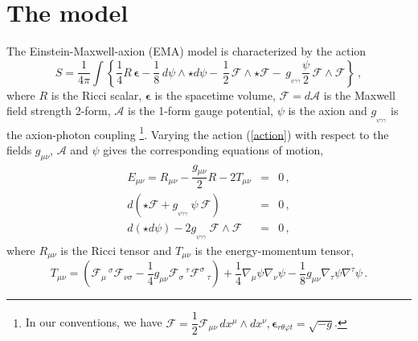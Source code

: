 \documentclass[11pt]{article}
\numberwithin{equation}{section} %
\begin{document}
\bigskip


	\section{The model}
	\label{sec2}



 The Einstein-Maxwell-axion (EMA) model is characterized by the action 
%
\begin{equation}
\label{action}
S= \frac{1}{4 \pi}\int \left\{\dfrac{1}{4}R\, \boldsymbol{\epsilon}
-\dfrac{1}{8}\, d\psi\wedge\star d \psi
-\, \dfrac{1}{2}\, 
\mathcal{F}\wedge\star\mathcal{F}
-\, g_{_{\psi\gamma\gamma}}\dfrac{\psi}{2}\, 
\mathcal{F}\wedge\mathcal{F}\right\} \ ,
\end{equation}
%
where $R$ is the Ricci scalar, $\boldsymbol{\epsilon}$ is the spacetime volume, $\mathcal{F}=d\mathcal{A}$ is the Maxwell field strength 2-form, $\mathcal{A}$ is the 1-form gauge potential, $\psi$ is the axion and $g_{_{\psi\gamma\gamma}}$ is the axion-photon coupling \footnote{In our conventions, we have $\mathcal{F}=\dfrac{1}{2}\mathcal{F}_{\mu\nu}\,dx^\mu\wedge dx^\nu, \boldsymbol{\epsilon}_{r\theta\varphi t}=\sqrt{-g}$. }. Varying the action (\ref{action}) with respect to the fields $g_{\mu\nu}$,  $\mathcal{A}$  {and  $\psi$}  gives the corresponding equations of motion,
%
\begin{eqnarray}
\label{EME}
E_{\mu\nu}=R_{\mu\nu}-\dfrac{g_{\mu\nu}}{2}R-2T_{\mu\nu}&=&0\,,
\\
\label{ME}
d\left(\star\mathcal{F}+g_{_{\psi\gamma\gamma}}\ \psi\ \mathcal{F}\right)&=&0
\,,
\\
\label{DE}
d\left(\star d\psi\right)-2g_{_{\psi\gamma\gamma}}\ \mathcal{F}\wedge\mathcal{F}&=&0 \,,
 \end{eqnarray}
  {where \(R_{\mu\nu}\) is the Ricci tensor and \(T_{\mu\nu}\) is}  the energy-momentum tensor,
\begin{equation}
\label{tik}
T_{\mu\nu}=
\left(
\mathcal{F}_\mu\,^\sigma\mathcal{F}_{\nu\sigma}-\frac{1}{4}g_{\mu\nu}\mathcal{F}_\sigma\,^\tau \mathcal{F}^\sigma\,_\tau
\right)
+ \dfrac{1}{4}\nabla_\mu\psi\nabla_\nu\psi-\dfrac{1}{8}g_{\mu\nu}\nabla_\tau\psi\nabla^{\tau}\psi\,.
\end{equation}
%
 
\end{document}
